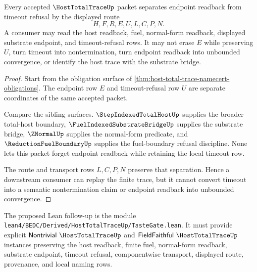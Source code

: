 \begin{theorem}
\label{thm:host-total-trace-timeout-endpoint-separation}
Every accepted $\HostTotalTraceUp$ packet separates endpoint readback from timeout refusal by the displayed route
$$
H,F,R,E,U,L,C,P,N.
$$
A consumer may read the host readback, fuel, normal-form readback, displayed substrate endpoint, and timeout-refusal rows. It may not erase $E$ while preserving $U$, turn timeout into nontermination, turn endpoint readback into unbounded convergence, or identify the host trace with the substrate bridge.
\end{theorem}
\begin{proof}
Start from the obligation surface of \autoref{thm:host-total-trace-namecert-obligations}. The endpoint row $E$ and timeout-refusal row $U$ are separate coordinates of the same accepted packet.

Compare the sibling surfaces. $\StepIndexedTotalHostUp$ supplies the broader total-host boundary, $\FuelIndexedSubstrateBridgeUp$ supplies the substrate bridge, $\ZNormalUp$ supplies the normal-form predicate, and $\ReductionFuelBoundaryUp$ supplies the fuel-boundary refusal discipline. None lets this packet forget endpoint readback while retaining the local timeout row.

The route and transport rows $L,C,P,N$ preserve that separation. Hence a downstream consumer can replay the finite trace, but it cannot convert timeout into a semantic nontermination claim or endpoint readback into unbounded convergence.
\end{proof}

The proposed Lean follow-up is the module \texttt{lean4/BEDC/Derived/HostTotalTraceUp/TasteGate.lean}. It must provide explicit $\mathsf{Nontrivial}\ \HostTotalTraceUp$ and $\mathsf{FieldFaithful}\ \HostTotalTraceUp$ instances preserving the host readback, finite fuel, normal-form readback, substrate endpoint, timeout refusal, componentwise transport, displayed route, provenance, and local naming rows.


